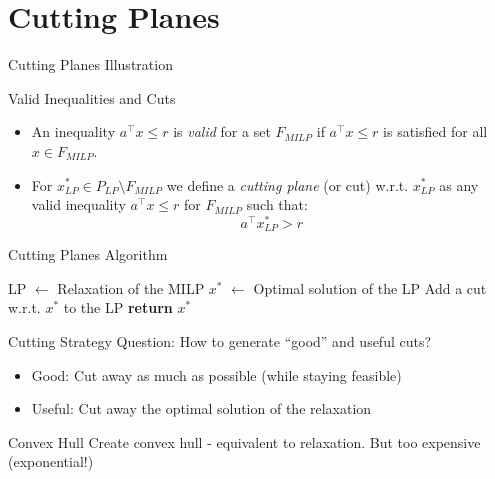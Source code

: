 \section{Cutting Planes}

\begin{frame}{Cutting Planes}
	Illustration %
\end{frame}

\begin{frame}{Valid Inequalities and Cuts}
\begin{itemize}
	\item An inequality $a^\top x \leq r$ is \emph{valid} for a set $F_{MILP}$ if $a^\top x \leq r$ is satisfied for all $x \in F_{MILP}$.
	\item For $x_{LP}^* \in P_{LP} \setminus F_{MILP}$ we define a \emph{cutting plane} (or cut) w.r.t. $x_{LP}^*$ as any valid inequality $a^\top x \leq r$ for $F_{MILP}$ such that:
	\begin{equation*}
		a^\top x_{LP}^* > r
	\end{equation*}
\end{itemize}

\end{frame}

\begin{frame}{Cutting Planes Algorithm}
     \begin{algorithmic}[1]
     \State LP $\gets$ Relaxation of the MILP
     \Repeat
    	\State $x^*$ $\gets$ Optimal solution of the LP 
    		\State Add a cut w.r.t. $x^*$ to the LP
    	\EndIf 
    \State \textbf{return} $x^*$
   \end{algorithmic}
\end{frame}

\begin{frame}[c]{Cutting Strategy}
\centering\large
	Question: How to generate ``good'' and useful cuts?
	\begin{itemize}[<+(1)->]
	\item Good: Cut away as much as possible (while staying feasible)
	\item Useful: Cut away the optimal solution of the relaxation
	\end{itemize}
\end{frame}

\begin{frame}{Convex Hull}
Create convex hull - equivalent to relaxation. But too expensive (exponential!) %
\end{frame}

